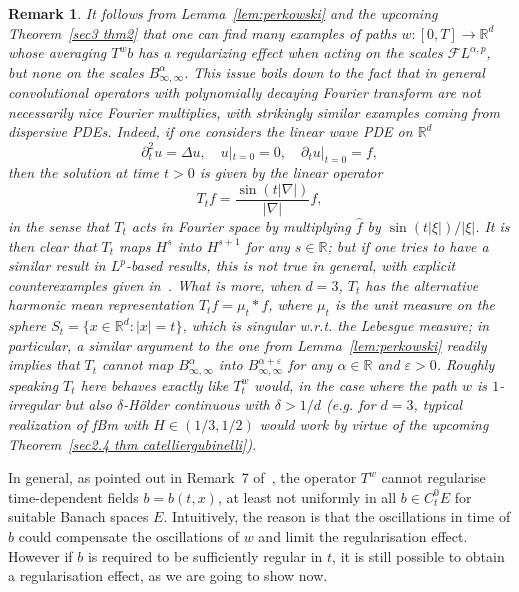 \documentclass[10pt]{article}
\newtheorem{remark}[theorem]{Remark}
\begin{document}
\begin{remark}
  \label{rem:tolomeo}It follows from Lemma~\ref{lem:perkowski} and the
  upcoming Theorem~\ref{sec3 thm2} that one can find many examples of paths $w
  : [0, T] \rightarrow \mathbb{R}^d$ whose averaging $T^w b$ has a
  regularizing effect when acting on the scales $\mathcal{F} L^{\alpha, p}$,
  but none on the scales $B^{\alpha}_{\infty, \infty}$. This issue boils down
  to the fact that in general convolutional operators with polynomially
  decaying Fourier transform are not necessarily nice Fourier multiplies, with
  strikingly similar examples coming from dispersive PDEs. Indeed, if one
  considers the linear wave PDE on $\mathbb{R}^d$
  \[ \partial_t^2 u = \Delta u, \quad u|_{t = 0} = 0, \quad \partial_t u|_{t =
     0} = f, \]
  then the solution at time $t > 0$ is given by the linear operator
  \[ T_t f = \frac{\sin (t | \nabla |)}{| \nabla |} f, \]
  in the sense that $T_t$ acts in Fourier space by multiplying $\hat{f}$ by
  $\sin (t | \xi |) / | \xi |$. It is then clear that $T_t$ maps $H^s$ into
  $H^{s + 1}$ for any $s \in \mathbb{R}$; but if one tries to have a similar
  result in $L^p$-based results, this is not true in general, with explicit
  counterexamples given in~{\cite{peral1970}}. What is more, when $d = 3$,
  $T_t$ has the alternative harmonic mean representation $T_t f = \mu_t \ast
  f$, where $\mu_t$ is the unit measure on the sphere $S_t = \{ x \in
  \mathbb{R}^d : | x | = t \}$, which is singular w.r.t. the Lebesgue measure;
  in particular, a similar argument to the one from Lemma~\ref{lem:perkowski}
  readily implies that $T_t$ cannot map $B^{\alpha}_{\infty, \infty}$ into
  $B^{\alpha + \varepsilon}_{\infty, \infty}$ for any $\alpha \in \mathbb{R}$
  and $\varepsilon > 0$. Roughly speaking $T_t$ here behaves exactly like
  $T^w_t$ would, in the case where the path $w$ is $1$-irregular but also
  $\delta$-H\"{o}lder continuous with $\delta > 1 / d$ (e.g. for $d = 3$,
  typical realization of fBm with $H \in (1 / 3, 1 / 2)$ would work by virtue
  of the upcoming Theorem~\ref{sec2.4 thm catelliergubinelli}).
\end{remark}

In general, as pointed out in Remark~7 of~{\cite{galeatigubinelli_ode}}, the
operator $T^w$ cannot regularise time\mbox{-}dependent fields $b = b (t, x)$,
at least not uniformly in all $b \in C^0_t E$ for suitable Banach spaces $E$.
Intuitively, the reason is that the oscillations in time of $b$ could
compensate the oscillations of $w$ and limit the regularisation effect.
However if $b$ is required to be sufficiently regular in $t$, it is still
possible to obtain a regularisation effect, as we are going to show now.
\end{document}

